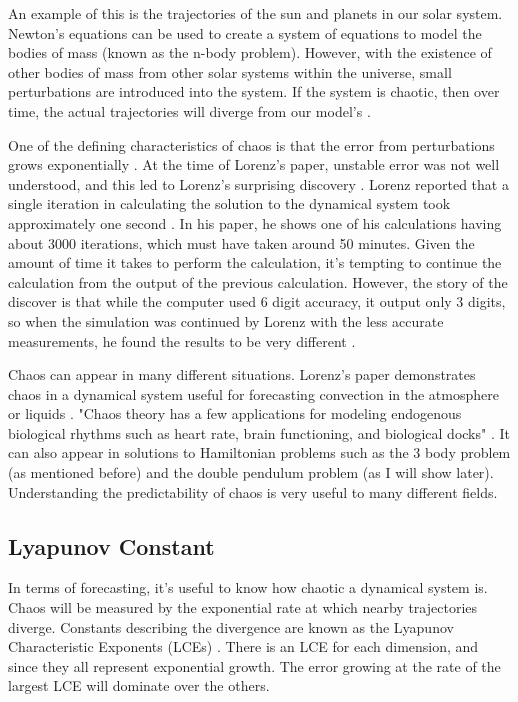 \documentclass{article}
\begin{document}
An example of this is the trajectories of the sun and planets in our solar
system. Newton's equations can be used to create a system of equations to
model the bodies of mass (known as the n-body problem). However, with the
existence of other bodies of mass from other solar systems within the
universe, small perturbations are introduced into the system. If the system
is chaotic, then over time, the actual trajectories will diverge from our
model's \cite{oestreicher2007history}.

One of the defining characteristics of chaos is that the error from
perturbations grows exponentially \cite{oestreicher2007history}. At the time
of Lorenz's paper, unstable error was not well understood, and this led to
Lorenz's surprising discovery \cite{oestreicher2007history}. Lorenz reported
that a single iteration in calculating the solution to the dynamical system
took approximately one second \cite{lorenz1963deterministic}. In his paper,
he shows one of his calculations having about 3000 iterations, which must
have taken around 50 minutes. Given the amount of time it takes to perform
the calculation, it's tempting to continue the calculation from the output of
the previous calculation. However, the story of the discover is that while
the computer used 6 digit accuracy, it output only 3 digits, so when the
simulation was continued by Lorenz with the less accurate measurements, he
found the results to be very different \cite{oestreicher2007history}.

Chaos can appear in many different situations. Lorenz's paper demonstrates
chaos in a dynamical system useful for forecasting convection in the
atmosphere or liquids \cite{lorenz1963deterministic}. "Chaos theory has a few
applications for modeling endogenous biological rhythms such as heart rate,
brain functioning, and biological docks" \cite{oestreicher2007history}. It
can also appear in solutions to Hamiltonian problems such as the 3 body
problem (as mentioned before) and the double pendulum problem (as I will show
later). Understanding the predictability of chaos is very useful to many
different fields.

\subsection{Lyapunov Constant}

In terms of forecasting, it's useful to know how chaotic a dynamical system
is. Chaos will be measured by the exponential rate at which nearby
trajectories diverge. Constants describing the divergence are known as the
Lyapunov Characteristic Exponents (LCEs) \cite{sandri1996numerical}. There is
an LCE for each dimension, and since they all represent exponential growth.
The error growing at the rate of the largest LCE will dominate over the
others.
\end{document}
